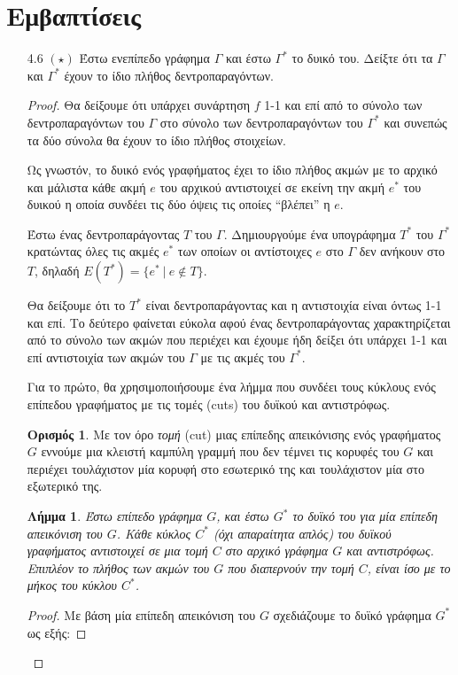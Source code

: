 \documentclass[a4paper, oneside, 11pt]{article}
\newtheorem{lm}[thm]{Λήμμα}
\theoremstyle{definition}
\newtheorem{defn}[thm]{Ορισμός}
\begin{document}
\section{Εμβαπτίσεις}
\begin{enumerate}
\item[4.6 $(\star)$]
   Έστω ενεπίπεδο γράφημα $\Gamma$ και έστω $\Gamma^*$ το δυικό του. Δείξτε
   ότι τα $\Gamma$ και $\Gamma^*$ έχουν το ίδιο πλήθος δεντροπαραγόντων.
   \begin{proof}

      Θα δείξουμε ότι υπάρχει συνάρτηση $f$ 1-1 και επί από το σύνολο των
      δεντροπαραγόντων του $\Gamma$ στο σύνολο των δεντροπαραγόντων
      του $\Gamma^*$ και συνεπώς τα δύο σύνολα θα έχουν το ίδιο πλήθος
      στοιχείων.

      Ως γνωστόν, το δυικό ενός γραφήματος έχει το ίδιο πλήθος ακμών
      με το αρχικό και μάλιστα κάθε ακμή $e$ του αρχικού αντιστοιχεί σε
      εκείνη την ακμή $e^*$ του δυικού η οποία συνδέει τις δύο όψεις τις
      οποίες ``βλέπει'' η $e$.

      Έστω ένας δεντροπαράγοντας $T$ του $\Gamma$. Δημιουργούμε ένα
      υπογράφημα $T^*$ του $\Gamma^*$ κρατώντας όλες τις ακμές $e^*$
      των οποίων οι αντίστοιχες $e$ στο $\Gamma$ δεν ανήκουν στο $T$,
      δηλαδή $E(T^*) = \{ e^*\ |\ e \notin T \}$.

      Θα δείξουμε ότι το $T^*$ είναι δεντροπαράγοντας και η αντιστοιχία
      είναι όντως 1-1 και επί. Το δεύτερο φαίνεται εύκολα αφού ένας
      δεντροπαράγοντας χαρακτηρίζεται από το σύνολο των ακμών που περιέχει
      και έχουμε ήδη δείξει ότι υπάρχει 1-1 και επί αντιστοιχία των ακμών
      του $\Gamma$ με τις ακμές του $\Gamma^*$.

      Για το πρώτο, θα χρησιμοποιήσουμε ένα λήμμα που συνδέει τους κύκλους
      ενός επίπεδου γραφήματος με τις τομές (cuts) του δυϊκού και αντιστρόφως.
      
      \begin{defn}
         Με τον όρο \emph{τομή} (cut) μιας επίπεδης απεικόνισης ενός γραφήματος
         $G$ εννούμε μια κλειστή καμπύλη γραμμή που δεν τέμνει τις κορυφές
         του $G$ και περιέχει τουλάχιστον μία κορυφή στο εσωτερικό της
         και τουλάχιστον μία στο εξωτερικό της.
      \end{defn}

      \begin{lm}
         Έστω επίπεδο γράφημα $G$, και έστω $G^*$ το δυϊκό του για μία επίπεδη
         απεικόνιση του $G$. Κάθε \emph{κύκλος} $C^*$ (όχι απαραίτητα απλός)
         του δυϊκού γραφήματος αντιστοιχεί σε μια \emph{τομή}
         $C$ στο αρχικό γράφημα $G$ και αντιστρόφως.
         Επιπλέον το πλήθος των ακμών του $G$ που διαπερνούν την τομή $C$,
         είναι ίσο με το μήκος του κύκλου $C^*$.
      \end{lm}
      \begin{proof}
         Με βάση μία επίπεδη απεικόνιση του $G$ σχεδιάζουμε το δυϊκό γράφημα $G^*$ ως εξής:


\end{proof}
\end{proof}
\end{enumerate}
\end{document}
